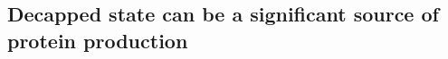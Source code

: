 \documentclass[review]{elsarticle}
\newcommand{\imax}{\ensuremath{i_{\max}}\xspace}
\begin{document}
%
%
%
%
%



\subsection{Decapped state can be a significant source of protein production}
\end{document}

